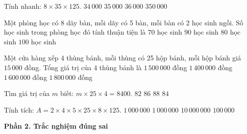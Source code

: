 \begin{ex} %
Tính nhanh: $8 \times 35 \times 125$.
\choice
{$34\,000$}
{\True $35\,000$}
{$36\,000$}
{$350\,000$}
\end{ex}

\begin{ex} %
Một phòng học có 8 dãy bàn, mỗi dãy có 5 bàn, mỗi bàn có 2 học sinh ngồi. Số học sinh trong phòng học đó tính thuận tiện là
\choice
{$70$ học sinh}
{$90$ học sinh}
{\True $80$ học sinh}
{$100$ học sinh}
\end{ex}

\begin{ex} %
Một cửa hàng xếp 4 thùng bánh, mỗi thùng có 25 hộp bánh, mỗi hộp bánh giá $15\,000$ đồng. Tổng giá trị của 4 thùng bánh là
\choice
{\True $1\,500\,000$ đồng}
{$1\,400\,000$ đồng}
{$1\,600\,000$ đồng}
{$1\,800\,000$ đồng}
\end{ex}

\begin{ex} %
Tìm giá trị của $m$ biết: $m \times 25 \times 4 = 8400$.
\choice
{$82$}
{$86$}
{$88$}
{\True $84$}
\end{ex}

\begin{ex} %
Tính tích: $A = 2 \times 4 \times 5 \times 25 \times 8 \times 125$.
\choice
{$1\,000\,000$}
{\True $1\,000\,000$}
{$10\,000\,000$}
{$100\,000$}
\end{ex}

\textbf{Phần 2. Trắc nghiệm đúng sai}

